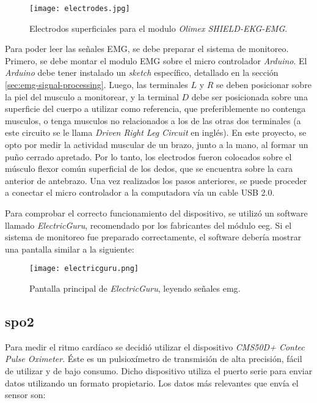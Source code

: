 \begin{figure}[H]
	\centering
    \texttt{[image: electrodes.jpg]}
    \caption{Electrodos superficiales para el modulo \emph{Olimex SHIELD-EKG-EMG}.}
	\label{fig:emg-electrodes}
\end{figure}

Para poder leer las señales EMG, se debe preparar el sistema de monitoreo.  Primero, se debe montar el modulo EMG sobre el micro controlador \emph{Arduino}.  El \emph{Arduino} debe tener instalado un \emph{sketch} específico, detallado en la sección \ref{sec:emg-signal-processing}. Luego, las terminales $L$ y $R$ se deben posicionar sobre la piel del musculo a monitorear, y la terminal $D$ debe ser posicionada sobre una superficie del cuerpo a utilizar como referencia, que preferiblemente no contenga musculos, o tenga musculos no relacionados a los de las otras dos terminales (a este circuito se le llama \emph{Driven Right Leg Circuit} en inglés). En este proyecto, se opto por medir la actividad muscular de un brazo, junto a la mano, al formar un puño cerrado apretado. Por lo tanto, los electrodos fueron colocados sobre el músculo flexor común superficial de los dedos, que se encuentra sobre la cara anterior de antebrazo\cite{emg-signals-wrist}. Una vez realizados los pasos anteriores, se puede proceder a conectar el micro controlador a la computadora vía un cable USB 2.0.

Para comprobar el correcto funcionamiento del dispositivo, se utilizó un software llamado \emph{ElectricGuru}, recomendado por los fabricantes del módulo \acrshort{eeg}. Si el sistema de monitoreo fue preparado correctamente, el software debería mostrar una pantalla similar a la siguiente:

\begin{figure}[H]
	\centering
    \texttt{[image: electricguru.png]}
    \caption{Pantalla principal de \emph{ElectricGuru}, leyendo señales \acrshort{emg}.}
	\label{fig:emg-electricguru}
\end{figure}

\subsection{\acrshort{spo2}}

Para medir el ritmo cardíaco se decidió utilizar el dispositivo \emph{CMS50D+ Contec Pulse Oximeter}. Éste es un pulsioxímetro de transmisión de alta precisión, fácil de utilizar y de bajo consumo. Dicho dispositivo utiliza el puerto serie para enviar datos utilizando un formato propietario. Los datos más relevantes que envía el sensor son:

